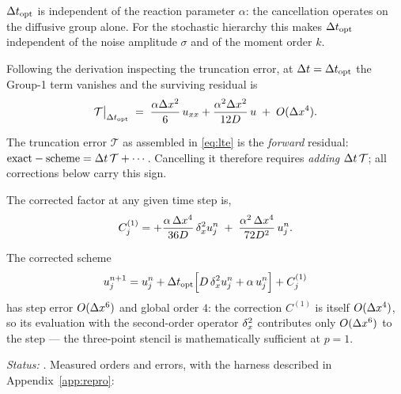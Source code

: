 \begin{proposition}\label{prop:alpha}
$\Delta t_{\mathrm{opt}}$ is independent of the reaction parameter $\alpha$: the cancellation
operates on the diffusive group alone. For the stochastic hierarchy this makes
$\Delta t_{\mathrm{opt}}$ independent of the noise amplitude $\sigma$ and of the moment order $k$.
\end{proposition}

Following the derivation inspecting the truncation error, at $\Delta t=\Delta t_{\mathrm{opt}}$ the Group-1 term vanishes and the surviving residual is
\begin{equation}\label{eq:resid}
\mathcal{T}\big|_{\Delta t_{\mathrm{opt}}} \;=\;
\frac{\alpha\Delta x^2}6\,u_{xx} + \frac{\alpha^2\Delta x^2}{12D}\,u \;+\; O(\Delta x^4).
\end{equation}

\begin{remark}\label{rem:sign}
The truncation error $\mathcal{T}$ as assembled in \eqref{eq:lte} is the \emph{forward} residual: $\text{exact} - \text{scheme} = \Delta t\,\mathcal{T} + \cdots$. Cancelling it therefore requires \emph{adding} $\Delta t\,\mathcal{T}$; all corrections below carry this sign.
\end{remark}

\begin{lemma}The corrected factor at any given time step is,
\begin{equation}\label{eq:C1}
C^{(1)}_j = +\frac{\alpha\,\Delta x^4}{36D}\,\delta_x^2 u^n_j \;+\; \frac{\alpha^2\,\Delta x^4}{72D^2}\,u^n_j.
\end{equation}
\end{lemma}

\begin{theorem}\label{thm:p1}

The corrected scheme
\begin{equation}\label{eq:scheme1} u^{n+1}_j = u^n_j + \Delta t_{\mathrm{opt}}\Bigl[D\,\delta_x^2 u^n_j + \alpha\,u^n_j\Bigr] + C^{(1)}_j
\end{equation} has step error $O(\Delta x^6)$ and global order $4$: the correction $C^{(1)}$ is itself $O(\Delta x^4)$, so its evaluation with the second-order operator $\delta_x^2$ contributes only $O(\Delta x^6)$ to the step --- the three-point stencil is mathematically sufficient at $p=1$.
\end{theorem}
\noindent\emph{Status:} \tagV. Measured orders and errors, with the harness described in Appendix~\ref{app:repro}:

